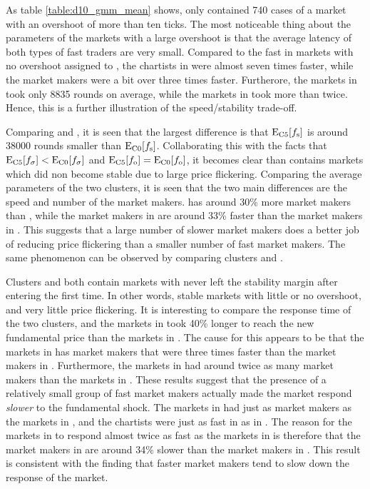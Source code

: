  As table \ref{table:d10_gmm_mean} shows, \dten{} only contained 740 cases of a market with an overshoot of more than ten ticks. The most noticeable thing about the parameters of the markets with a large overshoot is that the average latency of both types of fast traders are very small. Compared to the fast in markets with no overshoot assigned to , the chartists in \outliers were almost seven times faster, while the market makers were a bit over three times faster. Furtherore, the markets in \outliers{} took only 8835 rounds on average, while the markets in  took more than twice. Hence, this is a further illustration of the speed/stability trade-off. 
 
 Comparing  and , it is seen that the largest difference is that $\mathrm{E}_\text{C{5}}[f_\text{s}]$ is around 38000 rounds smaller than $\mathrm{E}_\text{C{0}}[f_\text{s}]$. Collaborating this with the facts that $\mathrm{E}_\text{C{5}}[f_\sigma] < \mathrm{E}_\text{C{0}}[f_\sigma]$ and $\mathrm{E}_\text{C{5}}[f_\text{o}] = \mathrm{E}_\text{C{0}}[f_\text{o}]$, it becomes clear than  contains markets which did non become stable due to large price flickering. Comparing the average parameters of the two clusters, it is seen that the two main differences are the speed and number of the market makers.  has around 30\% more market makers than , while the market makers in  are around 33\% faster than the market makers in . This suggests that a large number of slower market makers does a better job of reducing price flickering than a smaller number of fast market makers. The same phenomenon can be observed by comparing clusters  and .
 
 Clusters  and  both contain markets with never left the stability margin after entering the first time. In other words, stable markets with little or no overshoot, and very little price flickering. It is interesting to compare the response time of the two clusters, and the markets in  took 40\% longer to reach the new fundamental price than the markets in . The cause for this appears to be that the markets in  has market makers that were three times faster than the market makers in . Furthermore, the markets in  had around twice as many market makers than the markets in . These results suggest that the presence of a relatively small group of fast market makers actually made the market respond \textit{slower} to the fundamental shock. The markets in  had just as market makers as the markets in , and the chartists were just as fast in  as in . The reason for the markets in  to respond almost twice as fast as the markets in  is therefore that the market makers in  are around 34\% slower than the market makers in . This result is consistent with the finding that faster market makers tend to slow down the response of the market. 
 
